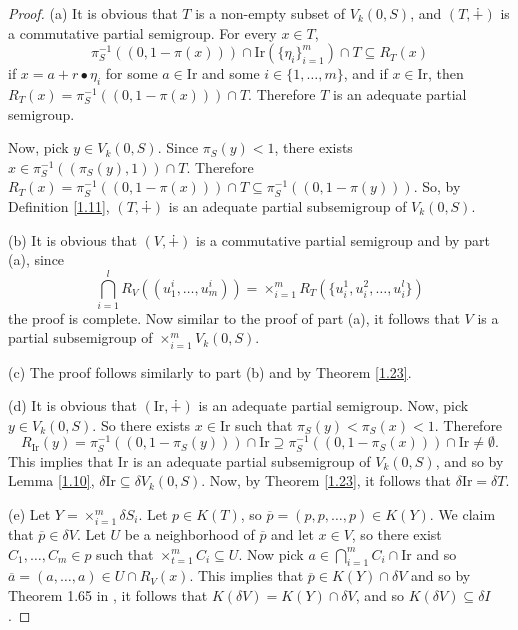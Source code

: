 \documentclass[twoside,11pt]{article}
\begin{document}
\begin{proof}
	(a) It is obvious that $T$ is a non-empty subset of $V_k(0,S)$, and $(T,\dotplus)$ is a commutative partial semigroup. For every $x\in T$, 
	\[
	\pi_S^{-1}\left((0,1-\pi(x))\right) \cap \mathrm{Ir}(\{\eta_i\}_{i=1}^m) \cap T \subseteq R_T(x)
	\]
	if $x = a + r \bullet \eta_i$ for some $a \in \mathrm{Ir}$ and some $i \in \{1,\ldots,m\}$, and if $x \in \mathrm{Ir}$, then $ R_T(x) = \pi_S^{-1}\left((0,1-\pi(x))\right) \cap T$. Therefore $T$ is an adequate partial semigroup.
	
	Now, pick $y \in V_k(0,S)$. Since $\pi_S(y) < 1$, there exists $x \in \pi_S^{-1}((\pi_S(y),1)) \cap T$. Therefore $R_T(x) = \pi_S^{-1}((0,1-\pi(x))) \cap T \subseteq \pi_S^{-1}((0,1-\pi(y)))$. So, by Definition \ref{1.11}, $(T,\dotplus)$ is an adequate partial subsemigroup of $V_k(0,S)$.
	
	(b) It is obvious that $(V,\dotplus)$ is a commutative partial semigroup and by part (a), since 
	\[
	\bigcap_{i=1}^l R_V((u^i_1,\ldots,u^i_m)) = \times_{i=1}^m R_T(\{u^1_i,u_i^2,\ldots,u_i^l\})
	\]
	the proof is complete. Now similar to the proof of part (a), it follows that $V$ is a partial subsemigroup of $\times_{i=1}^m V_k(0,S)$.
	
	(c) The proof follows similarly to part (b) and by Theorem \ref{1.23}.
	
	(d) It is obvious that $(\mathrm{Ir},\dotplus)$ is an adequate partial semigroup. Now, pick $y \in V_k(0,S)$. So there exists $x \in \mathrm{Ir}$ such that $\pi_S(y) < \pi_S(x) < 1$. Therefore 
	\[
	R_{\mathrm{Ir}}(y) = \pi_S^{-1}((0,1 - \pi_S(y))) \cap \mathrm{Ir} \supseteq \pi_S^{-1}((0,1 - \pi_S(x))) \cap \mathrm{Ir} \neq \emptyset.
	\]
	This implies that $\mathrm{Ir}$ is an adequate partial subsemigroup of $V_k(0,S)$, and so by Lemma \ref{1.10}, $\delta \mathrm{Ir} \subseteq \delta V_k(0,S)$. Now, by Theorem \ref{1.23}, it follows that $\delta \mathrm{Ir} = \delta T$.
	
	(e) Let $Y = \times_{i=1}^m \delta S_i$. Let \( p \in K(T)\), so \(\overline{p} = (p, p, \ldots, p) \in K(Y) \). We claim that $\overline{p} \in \delta V$. Let $U$ be a neighborhood of $\overline{p}$ and let $x \in V$, so there exist $C_1, \ldots, C_m \in p$ such that $\times_{t=1}^m C_i \subseteq U$. Now pick $a \in \bigcap_{i=1}^m C_i\cap \mathrm{Ir}$ and so $\overline{a} = (a,\ldots,a) \in U \cap R_V(x)$. This implies that $ \overline{p} \in K(Y) \cap \delta V$ and so by Theorem 1.65 in \cite{Hindman}, it follows that $K(\delta V) = K(Y) \cap \delta V$, and so $K(\delta V) \subseteq \delta I$. 
\end{proof}
\end{document}
